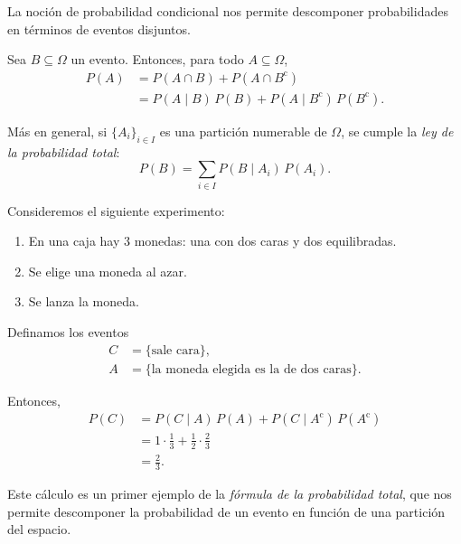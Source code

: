 La noción de probabilidad condicional nos permite descomponer probabilidades en términos de eventos disjuntos.

\begin{proposition}
    Sea $B \subseteq \Omega$ un evento. Entonces, para todo $A \subseteq \Omega$,
    \begin{align*}
        P(A) &= P(A \cap B) + P(A \cap B^{\mathrm c}) \\
             &= P(A \mid B)\,P(B) + P(A \mid B^{\mathrm c})\,P(B^{\mathrm c}).
    \end{align*}
\end{proposition}

Más en general, si $\{A_i\}_{i \in I}$ es una partición numerable de $\Omega$, se cumple la \textit{ley de la probabilidad total}:
\begin{equation*}
    P(B) = \sum_{i \in I} P(B \mid A_i)\,P(A_i).
\end{equation*}

\begin{example}
    Consideremos el siguiente experimento:
    \begin{centeredvarwidth}
        \begin{enumerate}
            \item En una caja hay $3$ monedas: una con dos caras y dos equilibradas.
            \item Se elige una moneda al azar.
            \item Se lanza la moneda.
        \end{enumerate}
    \end{centeredvarwidth}

    Definamos los eventos
    \begin{align*}
        C &= \{\text{sale cara}\}, \\
        A &= \{\text{la moneda elegida es la de dos caras}\}.
    \end{align*}

    Entonces,
    \begin{align*}
        P(C) &= P(C \mid A)\,P(A) + P(C \mid A^{\mathrm{c}})\,P(A^{\mathrm{c}}) \\
             &= 1 \cdot \frac{1}{3} + \frac{1}{2} \cdot \frac{2}{3} \\
             &= \frac{2}{3}.
    \end{align*}
\end{example}

Este cálculo es un primer ejemplo de la \emph{fórmula de la probabilidad total}, que nos permite descomponer la probabilidad de un evento en función de una partición del espacio.

